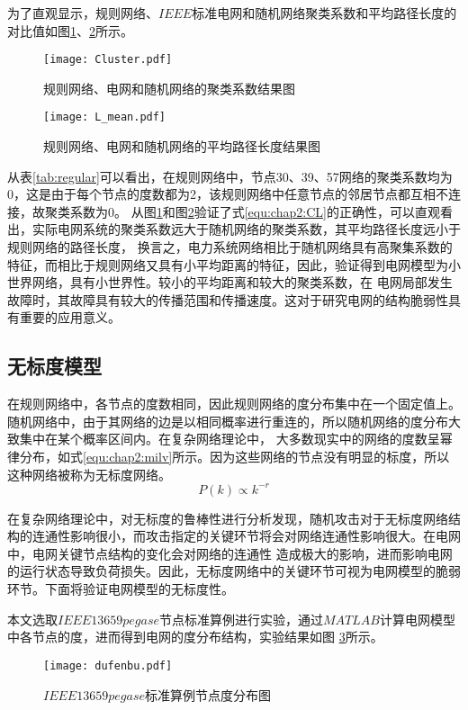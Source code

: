 为了直观显示，规则网络、$IEEE$标准电网和随机网络聚类系数和平均路径长度的对比值如图\ref{fig:Cluster}、\ref{fig:L_mean}所示。
\begin{figure}[H] %
    \centering
    \texttt{[image: Cluster.pdf]}
    \caption{规则网络、电网和随机网络的聚类系数结果图}
    \label{fig:Cluster}
\end{figure}

\begin{figure}[H] %
    \centering
    \texttt{[image: L\_mean.pdf]}
    \caption{规则网络、电网和随机网络的平均路径长度结果图}
    \label{fig:L_mean}
\end{figure}

从表\ref{tab:regular}可以看出，在规则网络中，节点30、39、57网络的聚类系数均为0，这是由于每个节点的度数都为2，该规则网络中任意节点的邻居节点都互相不连接，故聚类系数为0。
从图\ref{fig:Cluster}和图\ref{fig:L_mean}验证了式\ref{equ:chap2:CL}的正确性，可以直观看出，实际电网系统的聚类系数远大于随机网络的聚类系数，其平均路径长度远小于规则网络的路径长度，
换言之，电力系统网络相比于随机网络具有高聚集系数的特征，而相比于规则网络又具有小平均距离的特征，因此，验证得到电网模型为小世界网络，具有小世界性。较小的平均距离和较大的聚类系数，在
电网局部发生故障时，其故障具有较大的传播范围和传播速度。这对于研究电网的结构脆弱性具有重要的应用意义。

\subsection{无标度模型}
\label{sec:windModel}
在规则网络中，各节点的度数相同，因此规则网络的度分布集中在一个固定值上。随机网络中，由于其网络的边是以相同概率进行重连的，所以随机网络的度分布大致集中在某个概率区间内。在复杂网络理论中，
大多数现实中的网络的度数呈幂律分布，如式\ref{equ:chap2:milv}所示。因为这些网络的节点没有明显的标度，所以这种网络被称为无标度网络。
\begin{equation}
\label{equ:chap2:milv}
P(k) \propto k^{-r}
\end{equation}

在复杂网络理论中，对无标度的鲁棒性进行分析发现，随机攻击对于无标度网络结构的连通性影响很小，而攻击指定的关键环节将会对网络连通性影响很大。在电网中，电网关键节点结构的变化会对网络的连通性
造成极大的影响，进而影响电网的运行状态导致负荷损失\cite{refsBA}。因此，无标度网络中的关键环节可视为电网模型的脆弱环节。下面将验证电网模型的无标度性。

本文选取$IEEE13659pegase$节点标准算例进行实验，通过$MATLAB$计算电网模型中各节点的度，进而得到电网的度分布结构，实验结果如图
\ref{fig:dufenbu}所示。
\begin{figure}[H] %
  \centering
  \texttt{[image: dufenbu.pdf]}
  \caption{$IEEE13659pegase$标准算例节点度分布图}
  \label{fig:dufenbu}
\end{figure}

